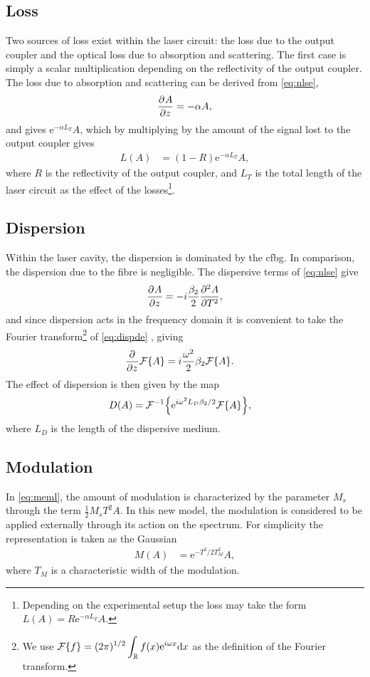 \subsection{Loss}
Two sources of loss exist within the laser circuit: the loss due to the output coupler and the optical loss due to absorption and scattering. The first case is simply a scalar multiplication depending on the reflectivity of the output coupler. The loss due to absorption and scattering can be derived from \eqref{eq:nlse},
\begin{align*}
\frac{\partial^{}A}{\partial{z}^{}} = - \alpha A,
\end{align*}
and gives $\textrm{e}^{-\alpha L_T}A$, which by multiplying by the amount of the signal lost to the output coupler gives
\begin{align*}
L(A) &= (1 - R) \textrm{e}^{- \alpha L_T}A,
\end{align*}
where $R$ is the reflectivity of the output coupler, and $L_T$ is the total length of the laser circuit as the effect of the losses\footnote{Depending on the experimental setup the loss may take the form $L(A) = R \textrm{e}^{- \alpha L_T}A$.}.

\subsection{Dispersion}
Within the laser cavity, the dispersion is dominated by the \gls{cfbg}. In comparison, the dispersion due to the fibre is negligible. The dispersive terms of \eqref{eq:nlse} give
\begin{align}
\label{eq:dispde}
	\pdiff{A}{z} = -i \frac{\beta_2}{2} \pdiff[2]{A}{T},
\end{align}
and since dispersion acts in the frequency domain it is convenient to take the Fourier transform\footnote{We use $\displaystyle \FT{f} = (2 \pi)^{1/2} \int_\mathbb{R} f(x) \textrm{e}^{i \omega x} \df x$ as the definition of the Fourier transform.} of \eqref{eq:dispde} \cite{debnath, gradshteyn}, giving
\begin{align*}
	\pdiff{}{z}\FT{A} &= i\frac{\omega^2}{2}\beta_2 \FT{A}.
\end{align*}
The effect of dispersion is then given by the map
\begin{align*}
D(A) &= \FTi{\textrm{e}^{i \omega^2 L_D\beta_2/2} \FT{A}},
\end{align*}
where $L_D$ is the length of the dispersive medium. \\

\subsection{Modulation}
In \eqref{eq:meml}, the amount of modulation is characterized by the parameter $M_s$ through the term $\frac{1}{2} M_s T^2 A$. In this new model, the modulation is considered to be applied externally through its action on the spectrum. For simplicity the representation is taken as the Gaussian
\begin{align*}
M(A) &= \textrm{e}^{-T^2 / 2 T_M^2} A,
\end{align*}
where $T_M$ is a characteristic width of the modulation. \\

